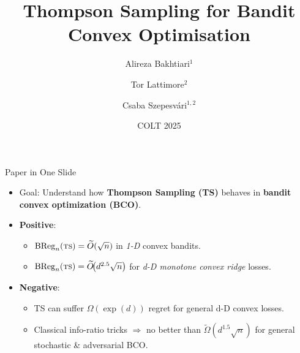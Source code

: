 \documentclass{beamer}
\title[Thompson Sampling for BCO]{Thompson Sampling for Bandit Convex Optimisation}
\author{Alireza Bakhtiari$^1$ \and Tor Lattimore$^2$ \and Csaba Szepesvári$^{1,2}$}
\institute{University of Alberta$^1$ \quad \& \quad Google DeepMind$^2$}
\date{COLT 2025}
\newcommand{\BReg}{\operatorname{BReg}}
\newcommand{\ts}{{\textsc{ts}}}
\begin{document}
\begin{frame}
    \titlepage
\end{frame}

\begin{frame}{Paper in One Slide}
    \begin{itemize}
        \item \alert{Goal}: Understand how \textbf{Thompson Sampling (TS)} behaves in \textbf{bandit convex optimization (BCO)}.
        \item \textbf{Positive}:
              \begin{itemize}
                  \item $\BReg_n(\ts) = \widetilde{O}(\sqrt{n})$ in \emph{1-D} convex bandits.
                  \item $\BReg_n(\ts) = \widetilde{O}\!\bigl(d^{2.5}\sqrt{n}\bigr)$ for \emph{d-D monotone convex ridge} losses.
              \end{itemize}
        \item \textbf{Negative}:
              \begin{itemize}
                  \item TS can suffer \(\Omega(\exp(d))\) regret for general d-D convex losses.
                  \item Classical info-ratio tricks \(\Rightarrow\) no better than \(\widetilde{\Omega}(d^{1.5}\sqrt{n})\) for general stochastic \& adversarial BCO.
              \end{itemize}
    \end{itemize}
\end{frame}
\end{document}
